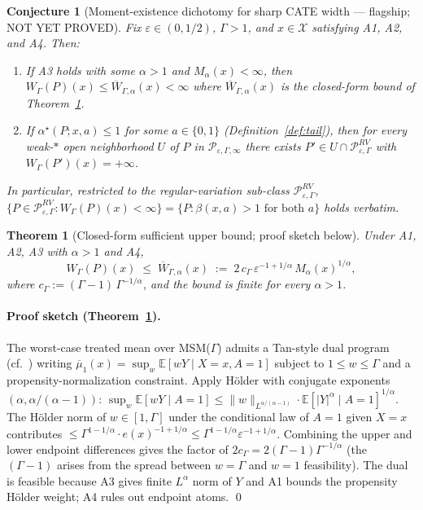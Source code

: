 \documentclass[11pt]{article}
\newcommand{\E}{\mathbb{E}}
\theoremstyle{definition}
\theoremstyle{plain}
\newtheorem{theorem}{Theorem}
\newtheorem{conjecture}{Conjecture}
\theoremstyle{remark}
\begin{document}
\begin{conjecture}[Moment-existence dichotomy for sharp CATE width --- flagship; NOT YET PROVED]\label{conj:dichotomy}
Fix $\varepsilon\in(0,1/2)$, $\Gamma>1$, and $x\in\mathcal{X}$ satisfying A1, A2, and A4. Then:
\begin{enumerate}[leftmargin=2em,itemsep=2pt]
  \item[(i) Sufficiency.] If A3 holds with some $\alpha>1$ and $M_{\alpha}(x)<\infty$, then $W_{\Gamma}(P)(x)\le \overline{W}_{\Gamma,\alpha}(x)<\infty$ where $\overline{W}_{\Gamma,\alpha}(x)$ is the closed-form bound of Theorem~\ref{thm:closed-form}.
  \item[(ii) Necessity (robust).] If $\alpha^{\star}(P;x,a)\le 1$ for some $a\in\{0,1\}$ (Definition~\ref{def:tail}), then for every weak-$*$ open neighborhood $U$ of $P$ in $\mathcal{P}_{\varepsilon,\Gamma,\infty}$ there exists $P'\in U\cap\mathcal{P}^{RV}_{\varepsilon,\Gamma}$ with $W_{\Gamma}(P')(x)=+\infty$.
\end{enumerate}
In particular, restricted to the regular-variation sub-class $\mathcal{P}^{RV}_{\varepsilon,\Gamma}$, $\{P\in\mathcal{P}^{RV}_{\varepsilon,\Gamma}:W_{\Gamma}(P)(x)<\infty\}=\{P:\beta(x,a)>1\text{ for both }a\}$ holds verbatim.
\end{conjecture}

\begin{theorem}[Closed-form sufficient upper bound; proof sketch below]\label{thm:closed-form}
Under A1, A2, A3 with $\alpha>1$ and A4,
\[
W_{\Gamma}(P)(x)\;\le\;\overline{W}_{\Gamma,\alpha}(x)\;:=\;2\,c_{\Gamma}\,\varepsilon^{-1+1/\alpha}\,M_{\alpha}(x)^{1/\alpha},
\]
where $c_{\Gamma}:=(\Gamma-1)\,\Gamma^{-1/\alpha}$, and the bound is finite for every $\alpha>1$.
\end{theorem}

\paragraph{Proof sketch (Theorem~\ref{thm:closed-form}).}
The worst-case treated mean over MSM($\Gamma$) admits a Tan-style dual program (cf.\ \citet{Tan2006MSM,KallusMaoZhou2019CATEIntervals}) writing $\overline{\mu}_1(x)=\sup_w \E[wY\mid X=x,A=1]$ subject to $1\le w\le\Gamma$ and a propensity-normalization constraint. Apply Hölder with conjugate exponents $(\alpha,\alpha/(\alpha-1))$: $\sup_w \E[wY\mid A=1]\le\|w\|_{L^{\alpha/(\alpha-1)}}\cdot \E[|Y|^{\alpha}\mid A=1]^{1/\alpha}$. The Hölder norm of $w\in[1,\Gamma]$ under the conditional law of $A=1$ given $X=x$ contributes $\le\Gamma^{1-1/\alpha}\cdot e(x)^{-1+1/\alpha}\le\Gamma^{1-1/\alpha}\varepsilon^{-1+1/\alpha}$. Combining the upper and lower endpoint differences gives the factor of $2c_{\Gamma}=2(\Gamma-1)\Gamma^{-1/\alpha}$ (the $(\Gamma-1)$ arises from the spread between $w=\Gamma$ and $w=1$ feasibility). The dual is feasible because A3 gives finite $L^{\alpha}$ norm of $Y$ and A1 bounds the propensity Hölder weight; A4 rules out endpoint atoms. \qed
\end{document}
